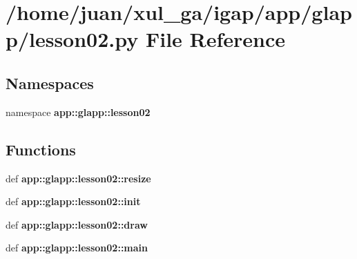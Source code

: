 \section{/home/juan/xul\_\-ga/igap/app/glapp/lesson02.py File Reference}
\label{lesson02_8py}
\subsection*{Namespaces}
\begin{CompactItemize}
\item 
namespace {\bf app::glapp::lesson02}
\end{CompactItemize}
\subsection*{Functions}
\begin{CompactItemize}
\item 
def {\bf app::glapp::lesson02::resize}
\item 
def {\bf app::glapp::lesson02::init}
\item 
def {\bf app::glapp::lesson02::draw}
\item 
def {\bf app::glapp::lesson02::main}
\end{CompactItemize}
